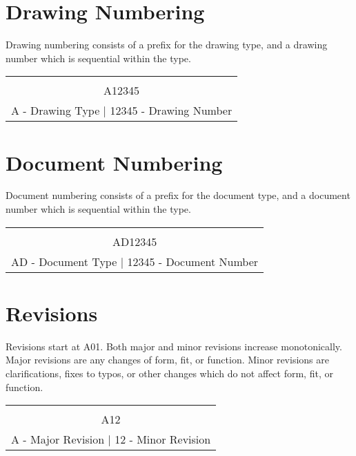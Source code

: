 \documentclass[12pt,article]{memoir}
\begin{document}
\section{Drawing Numbering}
Drawing numbering consists of a prefix for the drawing type, and a drawing number which is sequential within the type.
\begin{table}[h]
	\centering
	\begin{tabu}{|c|}
		\hline\\
		\huge \colorbox{shadecolor1}{A}\colorbox{shadecolor2}{12345}\\
		\colorbox{shadecolor1}{A} - Drawing Type | \colorbox{shadecolor2}{12345} - Drawing Number\\ \hline
	\end{tabu}
\end{table}\par

\section{Document Numbering}
Document numbering consists of a prefix for the document type, and a document number which is sequential within the type.
\begin{table}[h]
	\centering
	\begin{tabu}{|c|}
		\hline\\
		\huge \colorbox{shadecolor1}{AD}\colorbox{shadecolor2}{12345}\\
		\colorbox{shadecolor1}{AD} - Document Type | \colorbox{shadecolor2}{12345} - Document Number\\ \hline
	\end{tabu}
\end{table}\par

\section{Revisions}
Revisions start at A01. Both major and minor revisions increase monotonically. Major revisions are any changes of form, fit, or function. Minor revisions are clarifications, fixes to typos, or other changes which do not affect form, fit, or function.
\begin{table}[h]
	\centering
	\begin{tabu}{|c|}
		\hline\\
		\huge \colorbox{shadecolor1}{A}\colorbox{shadecolor2}{12}\\
		\colorbox{shadecolor1}{A} - Major Revision | \colorbox{shadecolor2}{12} - Minor Revision\\ \hline
	\end{tabu}
\end{table}
\end{document}
